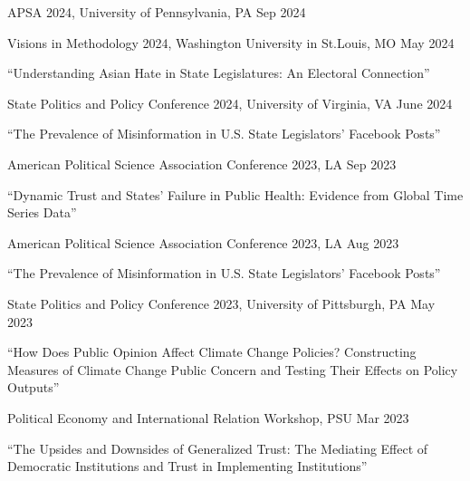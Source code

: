 \documentclass[10.5pt,]{article}
\providecommand{\tightlist}{%
	\setlength{\itemsep}{0pt}\setlength{\parskip}{0pt}}
\renewenvironment{itemize}{
	\begin{list}{}{
			\setlength{\leftmargin}{1.5em}
		}
	}{
	\end{list}
}
\begin{document}
\begin{itemize}
  \begin{itemize}
  \tightlist
  \item
    APSA 2024, University of Pennsylvania, PA \hfill Sep 2024
  \item
    Visions in Methodology 2024, Washington University in St.Louis, MO
    \hfill May 2024
  \end{itemize}
\item
  ``Understanding Asian Hate in State Legislatures: An Electoral
  Connection''

  \begin{itemize}
  \tightlist
  \item
    State Politics and Policy Conference 2024, University of Virginia,
    VA \hfill June 2024
  \end{itemize}
\item
  ``The Prevalence of Misinformation in U.S. State Legislators' Facebook
  Posts''

  \begin{itemize}
  \tightlist
  \item
    American Political Science Association Conference 2023, LA
    \hfill Sep 2023
  \end{itemize}
\item
  ``Dynamic Trust and States' Failure in Public Health: Evidence from
  Global Time Series Data''

  \begin{itemize}
  \tightlist
  \item
    American Political Science Association Conference 2023, LA
    \hfill Aug 2023
  \end{itemize}
\item
  ``The Prevalence of Misinformation in U.S. State Legislators' Facebook
  Posts''

  \begin{itemize}
  \tightlist
  \item
    State Politics and Policy Conference 2023, University of Pittsburgh,
    PA \hfill May 2023
  \end{itemize}
\item
  ``How Does Public Opinion Affect Climate Change Policies? Constructing
  Measures of Climate Change Public Concern and Testing Their Effects on
  Policy Outputs''

  \begin{itemize}
  \tightlist
  \item
    Political Economy and International Relation Workshop, PSU
    \hfill Mar 2023
  \end{itemize}
\item
  ``The Upsides and Downsides of Generalized Trust: The Mediating Effect
  of Democratic Institutions and Trust in Implementing Institutions''


\end{itemize}
\end{document}

